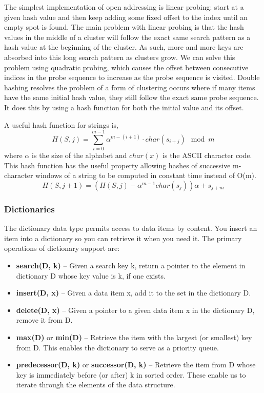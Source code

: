 \documentclass{article}
\begin{document}
    The simplest implementation of open addressing is linear probing: start at a given hash value and then keep adding some fixed offset to the index until an empty spot is found. The main problem with linear probing is that the hash values in the middle of a cluster will follow the exact same search pattern as a hash value at the beginning of the cluster. As such, more and more keys are absorbed into this long search pattern as clusters grow. We can solve this problem using quadratic probing, which causes the offset between consecutive indices in the probe sequence to increase as the probe sequence is visited. Double hashing resolves the problem of a form of clustering occurs where if many items have the same initial hash value, they still follow the exact same probe sequence. It does this by using a hash function for both the initial value and its offset.

    A useful hash function for strings is,
    \[
        H(S,j) = \sum_{i=0}^{m-1} \alpha^{m-(i+1)} \cdot char(s_{i+j}) \mod m
    \]
    where $\alpha$ is the size of the alphabet and $char(x)$ is the ASCII character code. This hash function has the useful property allowing hashes of successive m-character windows of a string to be computed in constant time instead of O(m).
    \[
        H(S, j+1) = (H(S,j) - \alpha^{m-1}char(s_j))\alpha + s_{j+m}
    \]
    
    \subsubsection{Dictionaries}
    The dictionary data type permits access to data items by content. You insert an item into a dictionary so you can retrieve it when you need it. The primary operations of dictionary support are:
    \begin{itemize}
        \item  \textbf{search(D, k)} – Given a search key k, return a pointer to the element in dictionary D whose key value is k, if one exists.
        \item \textbf{insert(D, x)} – Given a data item x, add it to the set in the dictionary D.
        \item \textbf{delete(D, x)} – Given a pointer to a given data item x in the dictionary D, remove it from D.
        \item \textbf{max(D)} or \textbf{min(D)} – Retrieve the item with the largest (or smallest) key from D. This enables the dictionary to serve as a priority queue.
        \item \textbf{predecessor(D, k)} or \textbf{successor(D, k)} – Retrieve the item from D whose key is immediately before (or after) k in sorted order. These enable us to iterate through the elements of the data structure.
    \end{itemize}
    
\end{document}
